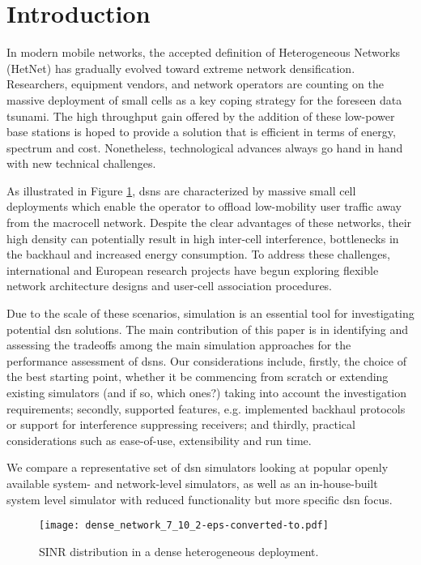 \documentclass[conference]{IEEEtran}
\begin{document}
\section{Introduction}

In modern mobile networks, the accepted definition of Heterogeneous Networks (HetNet) has gradually evolved toward extreme network
densification. Researchers, equipment vendors, and network operators are counting on the massive deployment of small cells as a key coping
strategy for the foreseen data tsunami. The high throughput gain offered by the addition of these low-power base stations is hoped to
provide a solution that is efficient in terms of energy, spectrum and cost. Nonetheless, technological advances always go hand in hand with
new technical challenges.

As illustrated in Figure \ref{fig:edn}, \acfp{dsn} are characterized by massive small cell deployments which enable the operator to offload
low-mobility user traffic away from the macrocell network. Despite the clear advantages of these networks, their high density can
potentially result in high inter-cell interference, bottlenecks in the backhaul and increased energy consumption. To address these
challenges, international and European research projects have begun exploring flexible network architecture designs and user-cell
association procedures.

Due to the scale of these scenarios, simulation is an essential tool for investigating potential \ac{dsn} solutions. 
The main contribution of this paper is in identifying and assessing the tradeoffs among the main simulation approaches for the performance assessment of \acp{dsn}.
Our considerations include, firstly, the choice of the best starting point, whether it be commencing from scratch or extending existing simulators (and if so, which ones?) taking into account the investigation requirements; secondly, supported features, e.g. implemented backhaul protocols
or support for interference suppressing receivers; and thirdly, practical considerations such as ease-of-use, extensibility and run time.

We compare a representative set of \ac{dsn} simulators looking at popular openly available system- and  network-level simulators, as well
as an in-house-built system level simulator with reduced functionality but more specific \ac{dsn} focus. 

\begin{figure}
    \centering  \texttt{[image: dense\_network\_7\_10\_2-eps-converted-to.pdf]}
\caption{\footnotesize SINR distribution in a dense heterogeneous deployment.}\label{fig:edn}
    \vspace{-5mm}
\end{figure}
\end{document}
